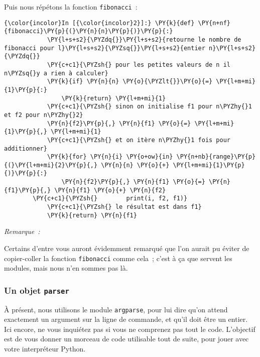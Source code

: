     Puis nous répétons la fonction \texttt{fibonacci}~:

    \begin{Verbatim}[commandchars=\\\{\}]
{\color{incolor}In [{\color{incolor}2}]:} \PY{k}{def} \PY{n+nf}{fibonacci}\PY{p}{(}\PY{n}{n}\PY{p}{)}\PY{p}{:}
            \PY{l+s+s2}{\PYZdq{}}\PY{l+s+s2}{retourne le nombre de fibonacci pour l}\PY{l+s+s2}{\PYZsq{}}\PY{l+s+s2}{entier n}\PY{l+s+s2}{\PYZdq{}}
            \PY{c+c1}{\PYZsh{} pour les petites valeurs de n il n\PYZsq{}y a rien à calculer}
            \PY{k}{if} \PY{n}{n} \PY{o}{\PYZlt{}}\PY{o}{=} \PY{l+m+mi}{1}\PY{p}{:}
                \PY{k}{return} \PY{l+m+mi}{1}
            \PY{c+c1}{\PYZsh{} sinon on initialise f1 pour n\PYZhy{}1 et f2 pour n\PYZhy{}2}
            \PY{n}{f2}\PY{p}{,} \PY{n}{f1} \PY{o}{=} \PY{l+m+mi}{1}\PY{p}{,} \PY{l+m+mi}{1}
            \PY{c+c1}{\PYZsh{} et on itère n\PYZhy{}1 fois pour additionner}
            \PY{k}{for} \PY{n}{i} \PY{o+ow}{in} \PY{n+nb}{range}\PY{p}{(}\PY{l+m+mi}{2}\PY{p}{,} \PY{n}{n} \PY{o}{+} \PY{l+m+mi}{1}\PY{p}{)}\PY{p}{:}
                \PY{n}{f2}\PY{p}{,} \PY{n}{f1} \PY{o}{=} \PY{n}{f1}\PY{p}{,} \PY{n}{f1} \PY{o}{+} \PY{n}{f2}
        \PY{c+c1}{\PYZsh{}        print(i, f2, f1)}
            \PY{c+c1}{\PYZsh{} le résultat est dans f1}
            \PY{k}{return} \PY{n}{f1}
\end{Verbatim}


    \emph{Remarque~:}

Certains d'entre vous auront évidemment remarqué que l'on aurait pu
éviter de copier-coller la fonction \texttt{fibonacci} comme cela~;
c'est à ça que servent les modules, mais nous n'en sommes pas là.

    \hypertarget{un-objet-parser}{%
\subsubsection{\texorpdfstring{Un objet
\texttt{parser}}{Un objet parser}}\label{un-objet-parser}}

    À présent, nous utilisons le module \texttt{argparse}, pour lui dire
qu'on attend exactement un argument sur la ligne de commande, et qu'il
doit être un entier. Ici encore, ne vous inquiétez pas si vous ne
comprenez pas tout le code. L'objectif est de vous donner un morceau de
code utilisable tout de suite, pour jouer avec votre interpréteur
Python.

